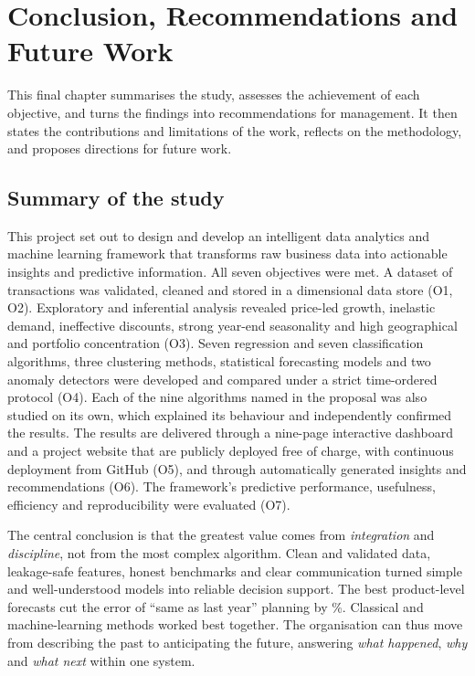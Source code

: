 \chapter{Conclusion, Recommendations and Future Work}\label{ch:conclusion}

This final chapter summarises the study, assesses the achievement of each objective, and turns the findings
into recommendations for management. It then states the contributions and limitations of the work, reflects on
the methodology, and proposes directions for future work.

\section{Summary of the study}
This project set out to design and develop an intelligent data analytics and machine learning framework that
transforms raw business data into actionable insights and predictive information. All seven objectives were
met. A dataset of \NRows transactions was validated, cleaned and stored in a dimensional data store (O1, O2).
Exploratory and inferential analysis revealed price-led growth, inelastic demand, ineffective discounts, strong
year-end seasonality and high geographical and portfolio concentration (O3). Seven regression and seven
classification algorithms, three clustering methods, statistical forecasting models and two anomaly detectors
were developed and compared under a strict time-ordered protocol (O4). Each of the nine algorithms named in the
proposal was also studied on its own, which explained its behaviour and independently confirmed the results.
The results are delivered through a nine-page interactive dashboard and a project website that are publicly
deployed free of charge, with continuous deployment from GitHub (O5), and through automatically generated
insights and recommendations (O6). The framework's predictive performance, usefulness, efficiency and reproducibility were
evaluated (O7).

The central conclusion is that the greatest value comes from \emph{integration} and \emph{discipline}, not from
the most complex algorithm. Clean and validated data, leakage-safe features, honest benchmarks and clear
communication turned simple and well-understood models into reliable decision support. The best
product-level forecasts cut the error of ``same as last year'' planning by \GainVsSNaive\%. Classical and
machine-learning methods worked best together. The organisation can thus move from describing the past to
anticipating the future, answering \emph{what happened}, \emph{why} and \emph{what next} within one system.

